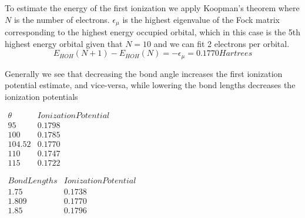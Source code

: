 \documentclass{article}
\begin{document}
To estimate the energy of the first ionization we apply Koopman's theorem where $N$ is the number of electrons. $\epsilon_{\mu}$ is the highest eigenvalue of the Fock matrix corresponding to the highest energy occupied orbital, which in this case is the 5th highest energy orbital given that $N=10$ and we can fit 2 electrons per orbital.
$$E_{HOH}(N+1) - E_{HOH}(N) = -\epsilon_{\mu} = 0.1770 Hartrees$$

Generally we see that decreasing the bond angle increases the first ionization potential estimate, and vice-versa, while lowering the bond lengths decreases the ionization potentials
\begin{center}
  $\begin{array}{c|c}
    \theta & Ionization Potential \\ \hline
    95 & 0.1798 \\
    100 & 0.1785 \\
    104.52 & 0.1770 \\
    110 & 0.1747 \\
    115 & 0.1722 
  \end{array}$
\end{center}

\begin{center}
  $\begin{array}{c|c}
    Bond Lengths & Ionization Potential \\ \hline
    1.75 & 0.1738 \\
    1.809 & 0.1770 \\
    1.85 & 0.1796
  \end{array}$
\end{center}
\end{document}
